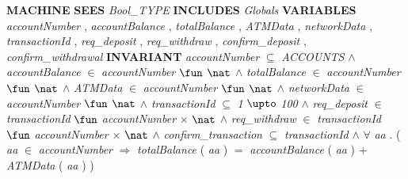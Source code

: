 %
\bsetindent
\begin{tabbing}
\bSetTabs
%
%
\bbnl
{\bf MACHINE} \bhsp{} \-\label{bankSystem3}
%
%
\bbnl
{\bf SEES} \+ \bbnl
{\em Bool\_TYPE\/}\label{Bool_TYPE}  \-
%
%
\bbnl
{\bf INCLUDES} \+ \bbnl
{\em Globals\/}\label{Globals}  \-
%
%
\bbnl
{\bf VARIABLES} \+ \bbnl
{\em accountNumber\/}\label{accountNumber}  , \bnl
{\em accountBalance\/}\label{accountBalance}  , {\em totalBalance\/}\label{totalBalance}  , \bnl
{\em ATMData\/}\label{ATMData}  , {\em networkData\/}\label{networkData}  , \bnl
{\em transactionId\/}\label{transactionId}  , \bnl
{\em req\_deposit\/}\label{req_deposit}  , \bnl
{\em req\_withdraw\/}\label{req_withdraw}  , \bnl
{\em confirm\_deposit\/}\label{confirm_deposit}  , {\em confirm\_withdrawal\/}\label{confirm_withdrawal}  \-
%
%
\bbnl
{\bf INVARIANT} \+ \bbnl
{\em accountNumber\/} $\subseteq$ {\em ACCOUNTS\/}\label{ACCOUNTS}  $\wedge$ \bnl
{\em accountBalance\/} $\in$ {\em accountNumber\/} $\fun$  $\nat$  $\wedge$ \bnl
{\em totalBalance\/} $\in$ {\em accountNumber\/} $\fun$  $\nat$  $\wedge$ \bnl
{\em ATMData\/} $\in$ {\em accountNumber\/} $\fun$  $\nat$  $\wedge$ \bnl
{\em networkData\/} $\in$ {\em accountNumber\/} $\fun$  $\nat$  $\wedge$ \bnl
{\em transactionId\/} $\subseteq$ {\em 1\/} $\upto$ {\em 100\/} $\wedge$ \bnl
{\em req\_deposit\/} $\in$ {\em transactionId\/} $\fun$ {\em accountNumber\/} $\times$  $\nat$  $\wedge$ \bnl
{\em req\_withdraw\/} $\in$ {\em transactionId\/} $\fun$ {\em accountNumber\/} $\times$  $\nat$  $\wedge$ \bnl
{\em confirm\_transaction\/} $\subseteq$ {\em transactionId\/} $\wedge$ \bnl
$\forall$ {\em aa\/} . ( {\em aa\/} $\in$ {\em accountNumber\/} $\Rightarrow$ \bnl
{\em totalBalance\/} ( {\em aa\/} )  $=$ {\em accountBalance\/} ( {\em aa\/} )  $+$ {\em ATMData\/} ( {\em aa\/} )  )
\end{tabbing}
\bresetindent
%
%
